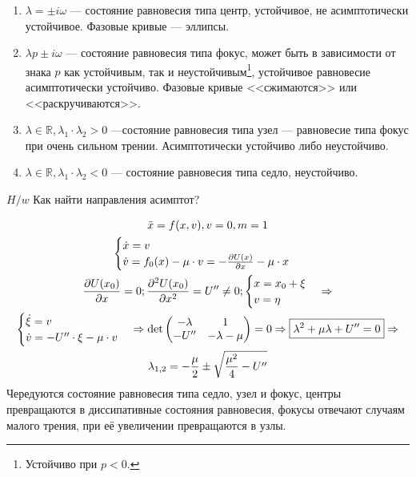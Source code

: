 \documentclass[12pt]{article}
\begin{document}
\begin{enumerate}
\item $\lambda = \pm i \omega$ --- состояние равновесия типа центр, устойчивое, не асимптотически устойчивое. Фазовые кривые --- эллипсы.
\item $\lambda p \pm i \omega$ --- состояние равновесия типа фокус, может быть в зависимости от знака $p$ как устойчивым, так и неустойчивым\footnote{Устойчиво при $p < 0$.}, устойчивое равновесие асимптотически устойчиво. Фазовые кривые <<сжимаются>> или <<раскручиваются>>.
\item $\lambda \in \mathbb{R}, \lambda_1 \cdot \lambda_2 > 0$ ---состояние равновесия типа узел --- равновесие типа фокус при очень сильном трении. Асимптотически устойчиво либо неустойчиво.
\item $\lambda \in \mathbb{R}, \lambda_1 \cdot \lambda_2 < 0$ --- состояние равновесия типа седло, неустойчиво.
\end{enumerate}
$H/w$ Как найти направления асимптот?

\begin{ex}
\begin{gather}
\ddot{x} = f(x, v), v =0, m = 1 \\
\begin{cases}
\dot{x} = v\\
\dot{v} = f_0(x) - \mu \cdot v = - \pdv{U(x)}{x} - \mu \cdot x
\end{cases}\\
\pdv{U(x_0)}{x} = 0; \pdv[2]{U(x_0)}{x} = U'' \neq 0; \begin{cases}
x = x_0 + \xi\\
v = \eta
\end{cases}
\Rightarrow\\
\begin{cases}
\dot{\xi} = v\\
\dot{v} = -U'' \cdot \xi - \mu \cdot v
\end{cases} \Rightarrow 
\det \begin{pmatrix}
-\lambda & 1\\
-U'' & -\lambda - \mu
\end{pmatrix} = 0 \Rightarrow \boxed{\lambda^2 + \mu \lambda + U'' = 0} \Rightarrow \\
\lambda_{1, 2} = - \frac{\mu}{2} \pm \sqrt{\frac{\mu^2}{4} - U''}
\end{gather}
Чередуются состояние равновесия типа седло, узел и фокус, центры превращаются в диссипативные состояния равновесия, фокусы отвечают случаям малого трения, при её увеличении превращаются в узлы.
\end{ex}
\end{document}
